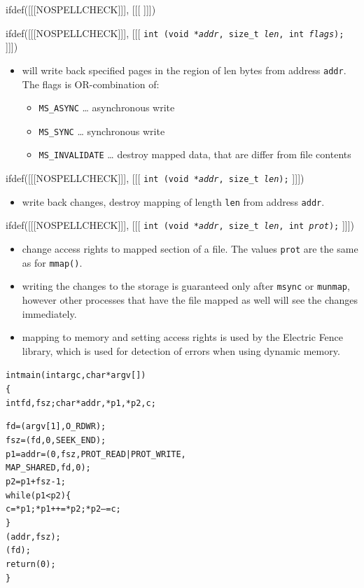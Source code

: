 
ifdef([[[NOSPELLCHECK]]], [[[
]]])

\begin{slide}
ifdef([[[NOSPELLCHECK]]], [[[
\texttt{int (void *\emph{addr}, size\_t \emph{l{}en},
int \emph{flags});}
]]])
\begin{itemize}
\item will write back specified pages in the region of l{}en bytes from address
\texttt{addr}. The flags is OR-combination of:
    \begin{itemize}
    \item \texttt{MS\_ASYNC} \dots{} asynchronous write
    \item \texttt{MS\_SYNC} \dots{} synchronous write
    \item \texttt{MS\_INVALIDATE} \dots{} destroy mapped data,
    that are differ from file contents
    \end{itemize}
\end{itemize}
ifdef([[[NOSPELLCHECK]]], [[[
\texttt{int (void *\emph{addr}, size\_t \emph{l{}en});}
]]])
\begin{itemize}
\item write back changes, destroy mapping of length \texttt{l{}en} from
address \texttt{addr}.
\end{itemize}
ifdef([[[NOSPELLCHECK]]], [[[
\texttt{int (void *\emph{addr}, size\_t \emph{l{}en},
int \emph{prot});}
]]])
\begin{itemize}
\item change access rights to mapped section of a file. The values
\texttt{prot} are the same as for \texttt{mmap()}.
\end{itemize}
\end{slide}

\begin{itemize}
\item writing the changes to the storage is guaranteed only after
\texttt{msync} or \texttt{munmap}, however other processes that have the file
mapped as well will see the changes immediately.
\item mapping to memory and setting access rights is used by the
Electric Fence library, which is used for detection of errors when using
dynamic memory.
\end{itemize}



\begin{slide}
\setlength{\baselineskip}{0.8\baselineskip}
\begin{alltt}
int main(int argc, char *argv[])
\{
    int fd, fsz; char *addr, *p1, *p2, c;

    fd = (argv[1], O\_RDWR);
    fsz = (fd, 0, SEEK\_END);
    p1 = addr = (0, fsz, PROT\_READ|PROT\_WRITE,
                     MAP\_SHARED, fd, 0);
    p2 = p1 + fsz - 1;
    while(p1<p2) \{
        c = *p1; *p1++ = *p2; *p2-- = c;
    \}
    (addr, fsz); 
    (fd);
    return (0);
\}
\end{alltt}
\end{slide}

